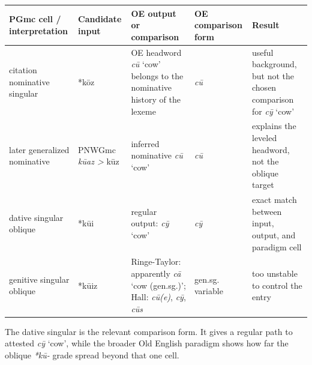 \documentclass[
  british,
  a4paper,
]{article}
\newcounter{none} %
\begin{document}
{\def\LTcaptype{none} %
\begin{longtable}[]{@{}
  >{\raggedright\arraybackslash}p{}
  >{\raggedright\arraybackslash}p{}
  >{\raggedright\arraybackslash}p{}
  >{\raggedright\arraybackslash}p{}
  >{\raggedright\arraybackslash}p{}@{}}
\toprule\noalign{}
\begin{minipage}[b]{\linewidth}\raggedright
PGmc cell / interpretation
\end{minipage} & \begin{minipage}[b]{\linewidth}\raggedright
Candidate input
\end{minipage} & \begin{minipage}[b]{\linewidth}\raggedright
OE output or comparison
\end{minipage} & \begin{minipage}[b]{\linewidth}\raggedright
OE comparison form
\end{minipage} & \begin{minipage}[b]{\linewidth}\raggedright
Result
\end{minipage} \\
\midrule\noalign{}
\endhead
\bottomrule\noalign{}
\endlastfoot
citation nominative singular & *kōz & OE headword {\emph{cū}} `cow'
belongs to the nominative history of the lexeme & \emph{cū} & useful
background, but not the chosen comparison for {\emph{cȳ}} `cow' \\
later generalized nominative & PNWGmc \emph{kūaz \textgreater{} }kūz &
inferred nominative {\emph{cū}} `cow' & \emph{cū} & explains the leveled
headword, not the oblique target \\
dative singular oblique & *kūi & regular output: {\emph{cȳ}} `cow' &
\emph{cȳ} & exact match between input, output, and paradigm cell \\
genitive singular oblique & *kūiz & Ringe-Taylor: apparently {\emph{cā}}
`cow (gen.sg.)'; Hall: \emph{cū(e)}, \emph{cȳ}, \emph{cūs} & gen.sg.
variable & too unstable to control the entry \\
\end{longtable}
}

The dative singular is the relevant comparison form. It gives a regular
path to attested {\emph{cȳ}} `cow', while the broader Old English
paradigm shows how far the oblique \emph{*kū-} grade spread beyond that
one cell.
\end{document}

